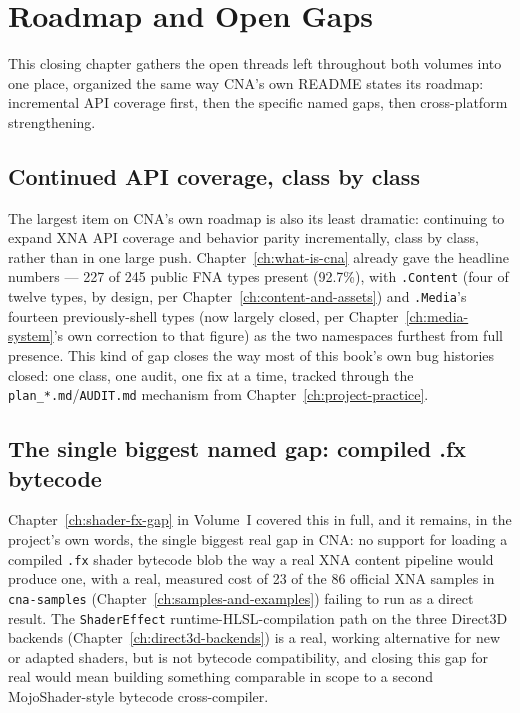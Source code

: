 \chapter{Roadmap and Open Gaps}
\label{ch:roadmap}

This closing chapter gathers the open threads left throughout both volumes into one place,
organized the same way CNA's own README states its roadmap: incremental API coverage first,
then the specific named gaps, then cross-platform strengthening.

\section{Continued API coverage, class by class}

The largest item on CNA's own roadmap is also its least dramatic: continuing to expand XNA
API coverage and behavior parity incrementally, class by class, rather than in one large
push. Chapter~\ref{ch:what-is-cna} already gave the headline numbers --- 227 of 245 public
FNA types present (92.7\%), with \texttt{.Content} (four of twelve types, by design, per
Chapter~\ref{ch:content-and-assets}) and \texttt{.Media}'s fourteen previously-shell types
(now largely closed, per Chapter~\ref{ch:media-system}'s own correction to that figure) as the
two namespaces furthest from full presence. This kind of gap closes the way most of this
book's own bug histories closed: one class, one audit, one fix at a time, tracked through the
\texttt{plan\_*.md}/\texttt{AUDIT.md} mechanism from Chapter~\ref{ch:project-practice}.

\section{The single biggest named gap: compiled .fx bytecode}

Chapter~\ref{ch:shader-fx-gap} in Volume~I covered this in full, and it remains, in the
project's own words, the single biggest real gap in CNA: no support for loading a compiled
\texttt{.fx} shader bytecode blob the way a real XNA content pipeline would produce one, with
a real, measured cost of 23 of the 86 official XNA samples in \texttt{cna-samples}
(Chapter~\ref{ch:samples-and-examples}) failing to run as a direct result. The
\texttt{ShaderEffect} runtime-HLSL-compilation path on the three Direct3D backends
(Chapter~\ref{ch:direct3d-backends}) is a real, working alternative for new or adapted
shaders, but is not bytecode compatibility, and closing this gap for real would mean building
something comparable in scope to a second MojoShader-style bytecode cross-compiler.

